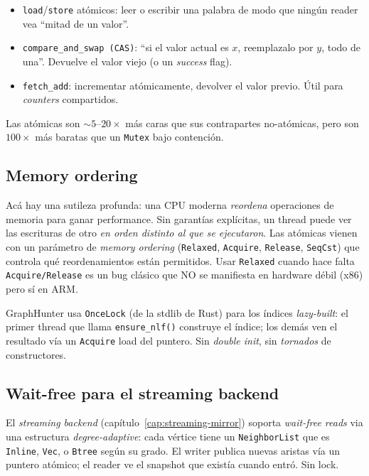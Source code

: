 \begin{itemize}
    \item \texttt{load}/\texttt{store} atómicos: leer o escribir una
    palabra de modo que ningún reader vea ``mitad de un valor''.
    \item \texttt{compare\_and\_swap (CAS)}: ``si el valor actual es
    \(x\), reemplazalo por \(y\), todo de una''. Devuelve el valor
    viejo (o un \emph{success} flag).
    \item \texttt{fetch\_add}: incrementar atómicamente, devolver el
    valor previo. Útil para \emph{counters} compartidos.
\end{itemize}

Las atómicas son \(\sim 5\)--\(20\times\) más caras que sus
contrapartes no-atómicas, pero son \(100\times\) más baratas que un
\texttt{Mutex} bajo contención.

\subsection{Memory ordering}

\begin{advertencia}
Acá hay una sutileza profunda: una CPU moderna \emph{reordena}
operaciones de memoria para ganar performance. Sin garantías
explícitas, un thread puede ver las escrituras de otro
\emph{en orden distinto al que se ejecutaron}. Las atómicas vienen
con un parámetro de \emph{memory ordering} (\texttt{Relaxed},
\texttt{Acquire}, \texttt{Release}, \texttt{SeqCst}) que controla
qué reordenamientos están permitidos. Usar \texttt{Relaxed} cuando
hace falta \texttt{Acquire/Release} es un bug clásico que NO se
manifiesta en hardware débil (x86) pero sí en ARM.
\end{advertencia}

GraphHunter usa \texttt{OnceLock} (de la stdlib de Rust) para los
índices \emph{lazy-built}: el primer thread que llama
\texttt{ensure\_nlf()} construye el índice; los demás ven el
resultado vía un \texttt{Acquire} load del puntero. Sin \emph{double
init}, sin \emph{tornados} de constructores.

\subsection{Wait-free para el streaming backend}

El \emph{streaming backend} (capítulo~\ref{cap:streaming-mirror})
soporta \emph{wait-free reads} via una estructura
\emph{degree-adaptive}: cada vértice tiene un \texttt{NeighborList}
que es \texttt{Inline}, \texttt{Vec}, o \texttt{Btree} según su
grado. El writer publica nuevas aristas vía un puntero atómico; el
reader ve el snapshot que existía cuando entró. Sin lock.


